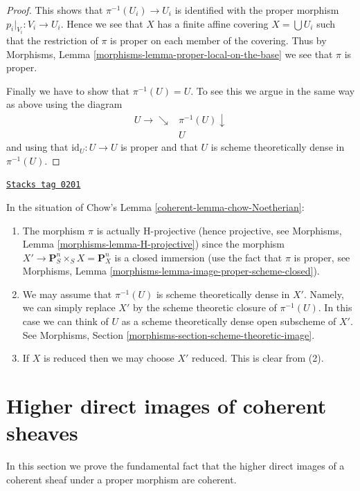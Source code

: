 \begin{proof}
\medskip\noindent
This shows that $\pi^{-1}(U_i) \to U_i$ is identified with the proper
morphism $p_i|_{V_i} : V_i \to U_i$. Hence we see that $X$ has a
finite affine covering $X = \bigcup U_i$ such that the restriction
of $\pi$ is proper on each member of the covering.
Thus by Morphisms, Lemma \ref{morphisms-lemma-proper-local-on-the-base}
we see that $\pi$ is proper.

\medskip\noindent
Finally we have to show that $\pi^{-1}(U) = U$. To see this we argue in the
same way as above using the diagram
$$
\begin{array}{cc}U \longrightarrow\searrow & \pi^{-1}(U) \downarrow \\  & U\end{array}
$$
and using that $\text{id}_U : U \to U$ is proper and that
$U$ is scheme theoretically dense in $\pi^{-1}(U)$.
\end{proof}

\begin{remark}
\label{coherent-remark-chow-Noetherian}
\href{https://stacks.math.columbia.edu/tag/0201}{\texttt{Stacks tag 0201}}

In the situation of Chow's
Lemma \ref{coherent-lemma-chow-Noetherian}:
\begin{enumerate}
\item The morphism $\pi$ is actually H-projective (hence projective, see
Morphisms, Lemma \ref{morphisms-lemma-H-projective})
since the morphism $X' \to \mathbf{P}^n_S \times_S X = \mathbf{P}^n_X$
is a closed immersion (use the fact that $\pi$ is proper, see
Morphisms, Lemma \ref{morphisms-lemma-image-proper-scheme-closed}).
\item We may assume that $\pi^{-1}(U)$ is scheme theoretically dense
in $X'$. Namely, we can simply replace $X'$ by the scheme theoretic
closure of $\pi^{-1}(U)$. In this case we can think of $U$ as a
scheme theoretically dense open subscheme of $X'$.
See Morphisms, Section \ref{morphisms-section-scheme-theoretic-image}.
\item If $X$ is reduced then we may choose $X'$ reduced. This is clear
from (2).
\end{enumerate}
\end{remark}

\section{Higher direct images of coherent sheaves}
\label{coherent-section-proper-pushforward}
In this section we prove the fundamental fact that the higher
direct images of a coherent sheaf under a proper morphism
are coherent.

